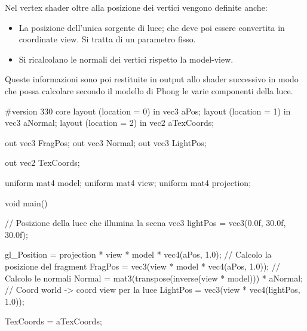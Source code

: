Nel vertex shader oltre alla posizione dei vertici vengono definite anche:
\begin{itemize}
\item La posizione dell'unica sorgente di luce; che deve poi essere convertita in coordinate view. Si tratta di un parametro fisso.
\item Si ricalcolano le normali dei vertici rispetto la model-view.
\end{itemize} 
Queste informazioni sono poi restituite in output allo shader successivo in modo che possa calcolare secondo il modello di Phong le varie componenti della luce.

\begin{cpp}[caption={Codice sorgente del Vertex Shader. Applica la trasformazione a tutti i vertici del modello e ritorna le coordinate texture, posizione della luce e le normali.}, captionpos=t]
#version 330 core
layout (location = 0) in vec3 aPos;
layout (location = 1) in vec3 aNormal;
layout (location = 2) in vec2 aTexCoords;

out vec3 FragPos;
out vec3 Normal;
out vec3 LightPos;

out vec2 TexCoords;

uniform mat4 model;
uniform mat4 view;
uniform mat4 projection;

void main()
{
	// Posizione della luce che illumina la scena
	vec3 lightPos = vec3(0.0f, 30.0f, 30.0f);
	
	gl_Position = projection * view * model * vec4(aPos, 1.0);
	// Calcolo la posizione del fragment
	FragPos = vec3(view * model * vec4(aPos, 1.0));
	// Calcolo le normali
	Normal = mat3(transpose(inverse(view * model))) * aNormal;
	// Coord world -> coord view per la luce
	LightPos = vec3(view * vec4(lightPos, 1.0)); 
	
	TexCoords = aTexCoords;
}
\end{cpp}










